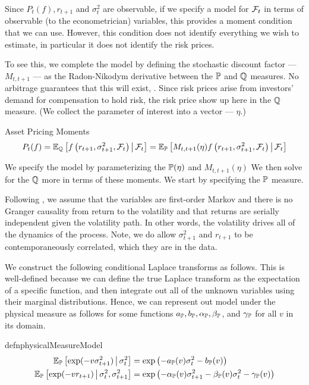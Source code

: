 \documentclass[11pt, letterpaper, twoside, final]{article}
\begin{document}
Since $P_t(f), r_{t+1}$ and $\sigma_t^2$ are observable, if we specify a model for $\mathcal{F}_t$ in terms of observable
(to the econometrician) variables, this provides a moment condition that we can use. 
However, this condition does not identify everything we wish to estimate, in particular it does not identify the
risk prices. 


To see this, we complete the model by defining the stochastic discount factor --- $M_{t, t+1}$ --- as the
Radon-Nikodym derivative between the $\mathbb{P}$ and $\mathbb{Q}$ measures. 
No arbitrage guarantees that this will exist, \parencite{harrison1978martingales}.
Since risk prices arise from investors' demand for compensation to hold risk, the risk price show up here 
in the $\mathbb{Q}$ measure. 
(We collect the parameter of interest into a vector --- $\eta$.)


\begin{defn}{Asset Pricing Moments}
    \begin{equation}
        P_t(f)  = \operatorname{\mathbb{E}}_{\mathbb{Q}} \left[f\left(r_{t+1}, \sigma^2_{t+1} , \mathcal{F}_t\right) \,\middle\vert\, \mathcal{F}_t \right] =
        \operatorname{\mathbb{E}}_{\mathbb{P}}\left[M_{t,t+1}(\eta)f\left(r_{t+1}, \sigma^2_{t+1}, \mathcal{F}_t\right) \,\middle\vert\, \mathcal{F}_t \right] 
    \end{equation}
\end{defn}

We specify the model by parameterizing the $\mathbb{P}(\eta)$ and $M_{t, t+1}(\eta)$
We then solve for the $\mathbb{Q}$ more in terms of these moments.
We start by specifying the $\mathbb{P}$ measure.

Following \textcite{khrapov2016affine}, we assume that the variables are first-order Markov and there is no
Granger causality from return to the volatility and that returns are serially independent given the volatility
path.
In other words, the volatility drives all of the dynamics of the process.
Note, we do allow $\sigma^2_{t+1}$ and $r_{t+1}$ to be contemporaneously correlated, which they are in the data. 

We construct the following conditional Laplace transforms as follows.
This is well-defined because we can define the true Laplace transform as the expectation of a specific function,
and then integrate out all of the unknown variables using their marginal distributions.
Hence, we can represent out model under the physical measure as follows for some functions $a_{\mathbb{P}}, b_{\mathbb{P}},
\alpha_{\mathbb{P}}, \beta_{\mathbb{P}}$, and $\gamma_{\mathbb{P}}$ for all $v$ in its domain.


\begin{restatable}{defn}{physicalMeasureModel}
    \label{defn:physical_model}
    \begin{align}
        \operatorname{\mathbb{E}}_{\mathbb{P}} \left[\exp(-v \sigma^2_{t+1}) \,\middle\vert\, \sigma^2_t \right] &= \exp\left( - a_{\mathbb{P}}(v) \sigma^2_t -
        b_{\mathbb{P}}(v) \right) \\
        \operatorname{\mathbb{E}}_{\mathbb{P}}\left[\exp(-v r_{t+1}) \,\middle\vert\, \sigma^2_t,  \sigma^2_{t+1}\right] &= \exp\left(- \alpha_{\mathbb{P}}(v)
        \sigma^2_{t+1} - \beta_{\mathbb{P}}(v)\sigma^2_t - \gamma_{\mathbb{P}}(v) \right) 
    \end{align}
\end{restatable}
\end{document}
